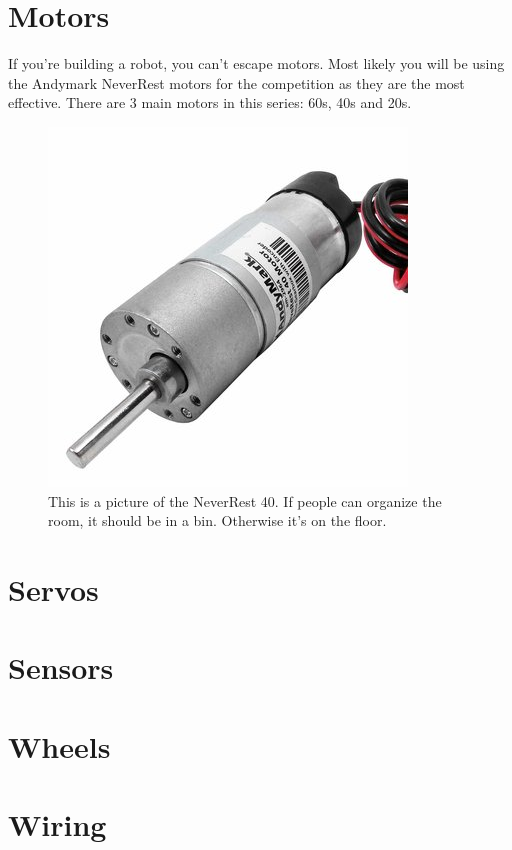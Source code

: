 \documentclass[../main.tex]{subfiles}
\begin{document}
\section{Motors}
If you're building a robot, you can't escape motors. Most likely you will be using the Andymark NeverRest motors for the competition as they are the most effective. There are 3 main motors in this series: 60s,  40s and 20s. 
\begin{figure}[H]
	\includegraphics{sections/controlSystem/images/motor.png}
	\caption{This is a picture of the NeverRest 40. If people can organize the room, it should be in a bin. Otherwise it's on the floor.}
\end{figure}
\section{Servos}
\section{Sensors}
\section{Wheels}
\section{Wiring}
\end{document}
